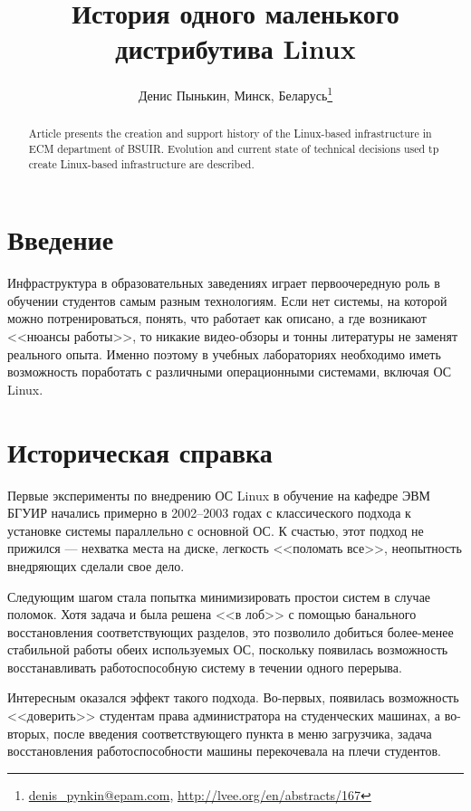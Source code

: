 \documentclass[10pt, a5paper]{article}
\begin{document}
\title{История одного маленького дистрибутива Linux}
\author{Денис Пынькин, Минск, Беларусь\footnote{\url{denis_pynkin@epam.com}, \url{http://lvee.org/en/abstracts/167}}}
\maketitle
\begin{abstract}
Article presents the creation and support history of the Linux-based infrastructure in ECM department of BSUIR. Evolution and current state of technical decisions used tp create Linux-based infrastructure are described.
\end{abstract}
\section*{Введение}

Инфраструктура в образовательных заведениях играет первоочередную роль в обучении студентов самым разным технологиям. Если нет системы, на которой можно потренироваться, понять, что работает как описано, а где возникают <<нюансы работы>>, то никакие видео-обзоры и тонны литературы не заменят реального опыта. Именно поэтому в учебных лабораториях необходимо иметь возможность поработать с различными операционными системами, включая ОС Linux.

\section*{Историческая справка}

Первые эксперименты по внедрению ОС Linux в обучение на кафедре ЭВМ БГУИР начались примерно в 2002--2003 годах с классического подхода к установке системы параллельно с основной ОС. К счастью, этот подход не прижился --- нехватка места на диске, легкость <<поломать все>>, неопытность внедряющих сделали свое дело.

Следующим шагом стала попытка минимизировать простои систем в случае поломок. Хотя задача и была решена <<в лоб>> с помощью банального восстановления соответствующих разделов, это позволило добиться более-менее стабильной работы обеих используемых ОС, поскольку появилась возможность восстанавливать работоспособную систему в течении одного перерыва.

Интересным оказался эффект такого подхода. Во-первых, появилась возможность <<доверить>> студентам права администратора на студенческих машинах, а во-вторых, после введения соответствующего пункта в меню загрузчика, задача восстановления работоспособности машины перекочевала на плечи студентов.
\end{document}
